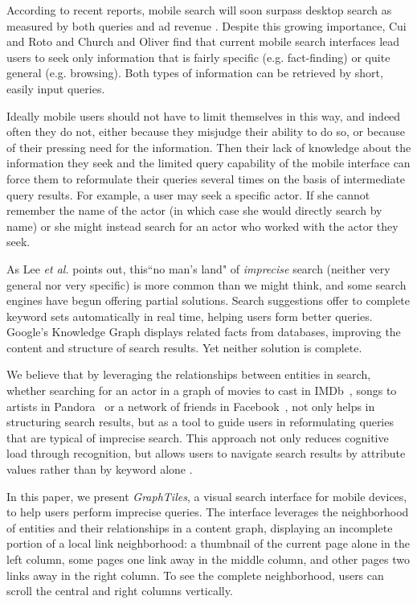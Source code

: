 According to recent reports, mobile search will soon surpass desktop search as measured by both queries and ad revenue \cite{MobileQueries}\cite{MobileRevenue}. Despite this growing importance, Cui and Roto \cite{Cui:2008} and Church and Oliver \cite{Church:2011} find that current mobile search interfaces lead users to seek only information that is fairly specific (e.g. fact-finding) or quite general (e.g. browsing). Both types of information can be retrieved by short, easily input queries.

Ideally mobile users should not have to limit themselves in this way, and indeed often they do not, either because they misjudge their ability to do so, or because of their pressing need for the information. Then their lack of knowledge about the information they seek and the limited query capability of the mobile interface \cite{Kamvar:2009} can force them to reformulate their queries several times on the basis of intermediate query results. For example, a user may seek a specific actor. If she cannot remember the name of the actor (in which case she would directly search by name) or she might instead search for an actor who worked with the actor they seek. 

As Lee \textit{et al.} \cite{Lee:2012} points out, this``no man's land" of \textit{imprecise} search (neither very general nor very specific) is more common than we might think, and some search engines have begun offering partial solutions. Search suggestions offer to complete keyword sets automatically in real time, helping users form better queries. Google's Knowledge Graph displays related facts from databases, improving the content and structure of search results. Yet neither solution is complete.

We believe that by leveraging the relationships between entities in search, whether searching for an actor in a graph of movies to cast in IMDb~\cite{imdb}, songs to artists in Pandora~\cite{pandora} or a network of friends in Facebook~\cite{Facebook}, not only helps in structuring search results, but as a tool to guide users in reformulating queries that are typical of imprecise search. This approach not only reduces cognitive load through recognition, but allows users to navigate search results by attribute values rather than by keyword alone \cite{Hearst:2002}.

In this paper, we present \textit{GraphTiles}, a visual search interface for mobile devices, to help users perform imprecise queries. The interface leverages the neighborhood of entities and their relationships in a content graph, displaying an incomplete portion of a local link neighborhood: a thumbnail of the current page alone in the left column, some pages one link away in the middle column, and other pages two links away in the right column. To see the complete neighborhood, users can scroll the central and right columns vertically.

